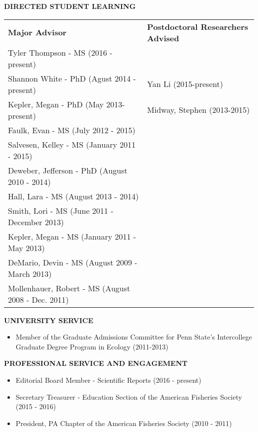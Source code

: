 \documentclass[10pt]{article}
\begin{document}
\begin{flushleft}
\begin{itemize}
\end{itemize}

\vspace{8pt}


\centerline {\bf{DIRECTED STUDENT LEARNING}}
\vspace{5pt}
\begin{tabularx}{\textwidth}{ XX }

\textbf{Major Advisor} & \textbf{Postdoctoral Researchers Advised} \\

Tyler Thompson - MS (2016 - present) & \\
Shannon White - PhD (Agust 2014 - present)  & Yan Li (2015-present)\\
Kepler, Megan - PhD (May 2013-present) & Midway, Stephen (2013-2015)\\
Faulk, Evan - MS (July 2012 - 2015) &  \\
Salvesen, Kelley - MS (January 2011 - 2015) & \\
Deweber, Jefferson - PhD (August 2010 - 2014) & \\
Hall, Lara - MS (August 2013 - 2014) & \\
Smith, Lori - MS (June 2011 - December 2013) & \\
Kepler, Megan - MS (January 2011 - May 2013) & \\
DeMario, Devin - MS (August 2009 - March 2013) & \\
Mollenhauer, Robert - MS (August 2008 - Dec. 2011) & \\
\end{tabularx}



\end{flushleft}

\centerline {\bf{UNIVERSITY SERVICE}}
\vspace{5pt}
\begin{itemize}
\item Member of the Graduate Admissions Committee for Penn State's Intercollege Graduate Degree Program in Ecology (2011-2013) 
\end{itemize}

\centerline {\bf{PROFESSIONAL SERVICE AND ENGAGEMENT}}
\vspace{5pt}
\begin{itemize}
\item Editorial Board Member - Scientific Reports (2016 - present)
\item Secretary Treasurer - Education Section of the American Fisheries Society (2015 - 2016)
\item President, PA Chapter of the American Fisheries Society (2010 - 2011)
\end{itemize}
\end{document}
